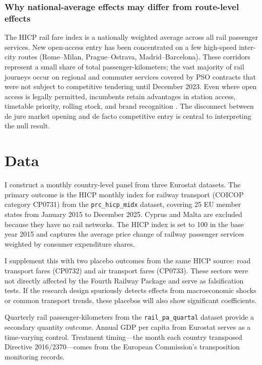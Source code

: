 \documentclass[12pt]{article}
\begin{document}
\subsubsection*{Why national-average effects may differ from route-level effects} The HICP rail fare index is a nationally weighted average across all rail passenger services. New open-access entry has been concentrated on a few high-speed inter-city routes (Rome--Milan, Prague--Ostrava, Madrid--Barcelona). These corridors represent a small share of total passenger-kilometers; the vast majority of rail journeys occur on regional and commuter services covered by PSO contracts that were not subject to competitive tendering until December 2023. Even where open access is legally permitted, incumbents retain advantages in station access, timetable priority, rolling stock, and brand recognition \citep{knieps2013competition}. The disconnect between de jure market opening and de facto competitive entry is central to interpreting the null result.


\section{Data}

I construct a monthly country-level panel from three Eurostat datasets. The primary outcome is the HICP monthly index for railway transport (COICOP category CP0731) from the \texttt{prc\_hicp\_midx} dataset, covering 25 EU member states from January 2015 to December 2025. Cyprus and Malta are excluded because they have no rail networks. The HICP index is set to 100 in the base year 2015 and captures the average price change of railway passenger services weighted by consumer expenditure shares.

I supplement this with two placebo outcomes from the same HICP source: road transport fares (CP0732) and air transport fares (CP0733). These sectors were not directly affected by the Fourth Railway Package and serve as falsification tests. If the research design spuriously detects effects from macroeconomic shocks or common transport trends, these placebos will also show significant coefficients.

Quarterly rail passenger-kilometers from the \texttt{rail\_pa\_quartal} dataset provide a secondary quantity outcome. Annual GDP per capita from Eurostat serves as a time-varying control. Treatment timing---the month each country transposed Directive 2016/2370---comes from the European Commission's transposition monitoring records.
\end{document}
